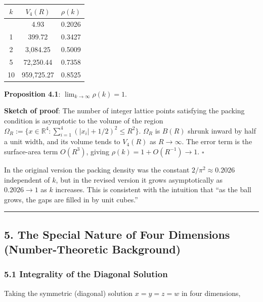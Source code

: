 \documentclass[a4paper,11pt]{article}
\theoremstyle{definition}
\begin{document}
{\def\LTcaptype{none} %
\begin{longtable}[]{@{}ccc@{}}
\toprule\noalign{}
\(k\) & \(V_4(R)\) & \(\rho(k)\) \\
\midrule\noalign{}
\endhead
\bottomrule\noalign{}
\endlastfoot
0 & 4.93 & 0.2026 \\
1 & 399.72 & 0.3427 \\
2 & 3,084.25 & 0.5009 \\
5 & 72,250.44 & 0.7358 \\
10 & 959,725.27 & 0.8525 \\
\end{longtable}
}

\textbf{Proposition 4.1}:
\(\displaystyle \lim_{k \to \infty} \rho(k) = 1\).

\textbf{Sketch of proof}: The number of integer lattice points
satisfying the packing condition is asymptotic to the volume of the
region
\(\Omega_R := \{x \in \mathbb{R}^4 : \sum_{i=1}^{4} (|x_i|+1/2)^2 \le R^2\}\).
\(\Omega_R\) is \(B(R)\) shrunk inward by half a unit width, and its
volume tends to \(V_4(R)\) as \(R \to \infty\). The error term is the
surface-area term \(O(R^3)\), giving \(\rho(k) = 1 + O(R^{-1}) \to 1\).
\(\square\)

In the original version the packing density was the constant
\(2/\pi^2 \approx 0.2026\) independent of \(k\), but in the revised
version it grows asymptotically as \(0.2026 \to 1\) as \(k\) increases.
This is consistent with the intuition that ``as the ball grows, the gaps
are filled in by unit cubes.''

\begin{center}\rule{0.5\linewidth}{0.5pt}\end{center}

\subsection{5. The Special Nature of Four Dimensions (Number-Theoretic
Background)}\label{the-special-nature-of-four-dimensions-number-theoretic-background}

\subsubsection{5.1 Integrality of the Diagonal
Solution}\label{integrality-of-the-diagonal-solution}

Taking the symmetric (diagonal) solution \(x = y = z = w\) in four
dimensions,
\end{document}
